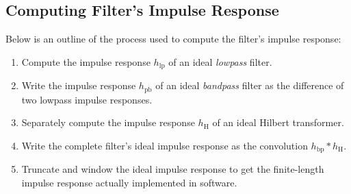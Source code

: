 \subsection{Computing Filter's Impulse Response}
Below is an outline of the process used to compute the filter's impulse response:
\begin{enumerate}

    \item Compute the impulse response $ h_{\mathrm{lp}} $ of an ideal \textit{lowpass} filter.

    \item Write the impulse response $ h_{\mathrm{pb}} $ of an ideal \textit{bandpass} filter as the difference of two lowpass impulse responses.
    
    \item Separately compute the impulse response $ h_{\mathrm{H}} $ of an ideal Hilbert transformer.

    \item Write the complete filter's ideal impulse response as the convolution $ h_{\mathrm{bp}} * h_{\mathrm{H}} $.

    \item Truncate and window the ideal impulse response to get the finite-length impulse response actually implemented in software.

\end{enumerate}

